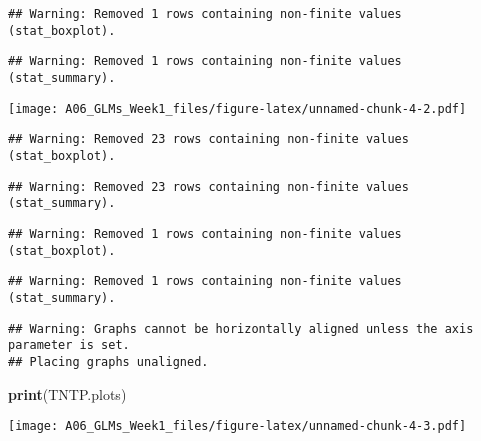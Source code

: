 \documentclass[]{article}
\newenvironment{Shaded}{\begin{snugshade}}{\end{snugshade}}
\newcommand{\KeywordTok}[1]{\textcolor[rgb]{0.13,0.29,0.53}{\textbf{#1}}}
\newcommand{\DataTypeTok}[1]{\textcolor[rgb]{0.13,0.29,0.53}{#1}}
\newcommand{\DecValTok}[1]{\textcolor[rgb]{0.00,0.00,0.81}{#1}}
\newcommand{\StringTok}[1]{\textcolor[rgb]{0.31,0.60,0.02}{#1}}
\newcommand{\CommentTok}[1]{\textcolor[rgb]{0.56,0.35,0.01}{\textit{#1}}}
\newcommand{\NormalTok}[1]{#1}
\begin{document}
\begin{verbatim}
## Warning: Removed 1 rows containing non-finite values (stat_boxplot).
\end{verbatim}

\begin{verbatim}
## Warning: Removed 1 rows containing non-finite values (stat_summary).
\end{verbatim}

\texttt{[image: A06\_GLMs\_Week1\_files/figure-latex/unnamed-chunk-4-2.pdf]}

\begin{Shaded}
\end{Shaded}

\begin{verbatim}
## Warning: Removed 23 rows containing non-finite values (stat_boxplot).
\end{verbatim}

\begin{verbatim}
## Warning: Removed 23 rows containing non-finite values (stat_summary).
\end{verbatim}

\begin{verbatim}
## Warning: Removed 1 rows containing non-finite values (stat_boxplot).
\end{verbatim}

\begin{verbatim}
## Warning: Removed 1 rows containing non-finite values (stat_summary).
\end{verbatim}

\begin{verbatim}
## Warning: Graphs cannot be horizontally aligned unless the axis parameter is set.
## Placing graphs unaligned.
\end{verbatim}

\begin{Shaded}
\begin{Highlighting}[]
\KeywordTok{print}\NormalTok{(TNTP.plots)}
\end{Highlighting}
\end{Shaded}

\texttt{[image: A06\_GLMs\_Week1\_files/figure-latex/unnamed-chunk-4-3.pdf]}
\end{document}
